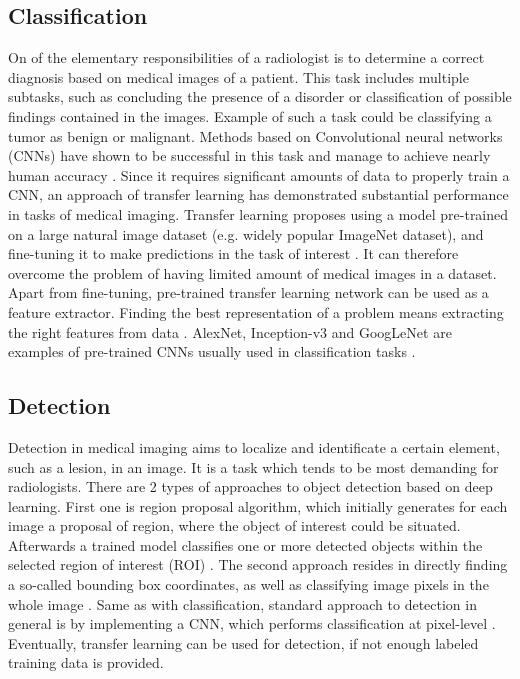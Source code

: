 \subsection{Classification}
On of the elementary responsibilities of a radiologist is to determine a correct diagnosis based on medical images of a patient. This task includes multiple subtasks, such as concluding the presence of a disorder or classification of possible findings contained in the images. Example of such a task could be classifying a tumor as benign or malignant. Methods based on Convolutional neural networks (CNNs) have shown to be successful in this task and manage to achieve nearly human accuracy \cite{deeplearningHealthcare}. Since it requires significant amounts of data to properly train a CNN, an approach of transfer learning has demonstrated substantial performance in tasks of medical imaging. Transfer learning proposes using a model pre-trained on a large natural image dataset (e.g. widely popular ImageNet dataset), and fine-tuning it to make predictions in the task of interest \cite{IEEEtransfer}. It can therefore overcome the problem of having limited amount of medical images in a dataset. Apart from fine-tuning, pre-trained transfer learning network can be used as a feature extractor. Finding the best representation of a problem means extracting the right features from data \cite{surveyOnImageing}. AlexNet, Inception-v3 and GoogLeNet are examples of pre-trained CNNs usually used in classification tasks \cite{IEEEtransfer}.
\subsection{Detection}
Detection in medical imaging aims to localize and identificate a certain element, such as a lesion, in an image. It is a task which tends to be most demanding for radiologists. There are 2 types of approaches to object detection based on deep learning. First one is region proposal algorithm, which initially generates for each image a proposal of region, where the object of interest could be situated. Afterwards a trained model classifies one or more detected objects within the selected region of interest (ROI) \cite{kim2019deep}. The second approach resides in directly finding a so-called bounding box coordinates, as well as classifying image pixels in the whole image \cite{kim2019deep}. Same as with classification, standard approach to detection in general is by implementing a CNN, which performs classification at pixel-level \cite{surveyOnImageing}. Eventually, transfer learning can be used for detection, if not enough labeled training data is provided. 
